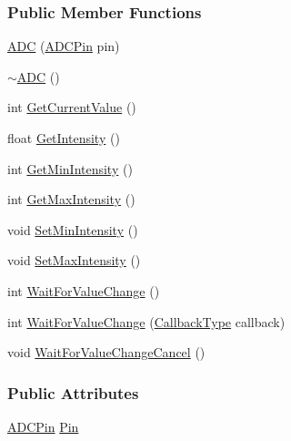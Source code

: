 \subsubsection*{Public Member Functions}
\begin{DoxyCompactItemize}
\item 
\hyperlink{class_hardware_1_1_a_d_c_a33a1de0705c6dd6b549bf5f48b3ff86c}{A\+D\+C} (\hyperlink{class_hardware_1_1_a_d_c_adb1507998c096cbdf7031527f6a690cf}{A\+D\+C\+Pin} pin)
\item 
\hyperlink{class_hardware_1_1_a_d_c_aefd878291d0c14aa524df99af5a63148}{$\sim$\+A\+D\+C} ()
\item 
int \hyperlink{class_hardware_1_1_a_d_c_a9725b2fe1346b17149fb74142e4a8315}{Get\+Current\+Value} ()
\item 
float \hyperlink{class_hardware_1_1_a_d_c_ac38274c9155e3de74276e251286415ce}{Get\+Intensity} ()
\item 
int \hyperlink{class_hardware_1_1_a_d_c_ac571740345f53a3004c3a1c236f938d4}{Get\+Min\+Intensity} ()
\item 
int \hyperlink{class_hardware_1_1_a_d_c_af03f3522f679e266b3a994e30468b5ca}{Get\+Max\+Intensity} ()
\item 
void \hyperlink{class_hardware_1_1_a_d_c_a3703337f2df47ae09c52e6a105e739a3}{Set\+Min\+Intensity} ()
\item 
void \hyperlink{class_hardware_1_1_a_d_c_a998247eb9c5288249b6408312618857a}{Set\+Max\+Intensity} ()
\item 
int \hyperlink{class_hardware_1_1_a_d_c_a7ae87fbf53ba93e33ea6eed41509a1f7}{Wait\+For\+Value\+Change} ()
\item 
int \hyperlink{class_hardware_1_1_a_d_c_a9e1e40c8633ce7bffbfd9f30871290d4}{Wait\+For\+Value\+Change} (\hyperlink{namespace_hardware_a5ba2e4bdfa2bbd8b551b1d5b2a0c61fd}{Callback\+Type} callback)
\item 
void \hyperlink{class_hardware_1_1_a_d_c_aec4d561199bb0f798a28ddd3c8c75543}{Wait\+For\+Value\+Change\+Cancel} ()
\end{DoxyCompactItemize}
\subsubsection*{Public Attributes}
\begin{DoxyCompactItemize}
\item 
\hyperlink{class_hardware_1_1_a_d_c_adb1507998c096cbdf7031527f6a690cf}{A\+D\+C\+Pin} \hyperlink{class_hardware_1_1_a_d_c_acb6d23369c7047296af402ca480bb2f5}{Pin}
\end{DoxyCompactItemize}
